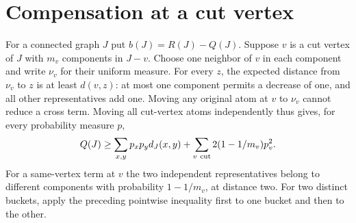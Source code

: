 \documentclass[11pt,a4paper]{article}
\begin{document}
\section{Compensation at a cut vertex}
For a connected graph $J$ put $b(J)=R(J)-Q(J)$.
Suppose $v$ is a cut vertex of $J$ with $m_v$ components in $J-v$.
Choose one neighbor of $v$ in each component and write $\nu_v$ for their
uniform measure. For every $z$, the expected distance from $\nu_v$ to $z$
is at least $d(v,z)$: at most one component permits a decrease of one,
and all other representatives add one. Moving any original atom at $v$
to $\nu_v$ cannot reduce a cross term. Moving all cut-vertex atoms
independently thus gives, for every probability measure $p$,
\begin{equation}\label{p10-atom}
 Q(J)\ge \sum_{x,y}p_xp_y d_J(x,y)
       +\sum_{v\ {\rm cut}}2(1-1/m_v)p_v^2 .
\end{equation}
For a same-vertex term at $v$ the two independent representatives belong
to different components with probability $1-1/m_v$, at distance two.
For two distinct buckets, apply the preceding pointwise inequality first
to one bucket and then to the other.
\end{document}
